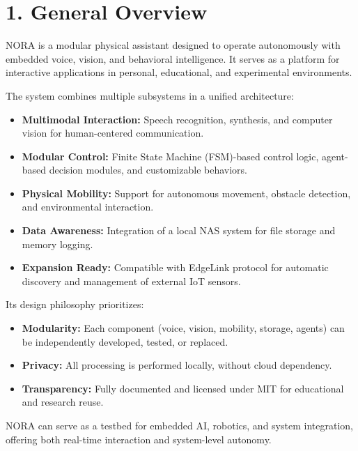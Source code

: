 \section*{1. General Overview}

NORA is a modular physical assistant designed to operate autonomously with embedded voice, vision, and behavioral intelligence. It serves as a platform for interactive applications in personal, educational, and experimental environments.

\vspace{0.5cm}

The system combines multiple subsystems in a unified architecture:

\begin{itemize}
	\item \textbf{Multimodal Interaction:} Speech recognition, synthesis, and computer vision for human-centered communication.
	\item \textbf{Modular Control:} Finite State Machine (FSM)-based control logic, agent-based decision modules, and customizable behaviors.
	\item \textbf{Physical Mobility:} Support for autonomous movement, obstacle detection, and environmental interaction.
	\item \textbf{Data Awareness:} Integration of a local NAS system for file storage and memory logging.
	\item \textbf{Expansion Ready:} Compatible with EdgeLink protocol for automatic discovery and management of external IoT sensors.
\end{itemize}

\vspace{0.5cm}

Its design philosophy prioritizes:
\begin{itemize}
	\item \textbf{Modularity:} Each component (voice, vision, mobility, storage, agents) can be independently developed, tested, or replaced.
	\item \textbf{Privacy:} All processing is performed locally, without cloud dependency.
	\item \textbf{Transparency:} Fully documented and licensed under MIT for educational and research reuse.
\end{itemize}

\vspace{0.5cm}

NORA can serve as a testbed for embedded AI, robotics, and system integration, offering both real-time interaction and system-level autonomy.


